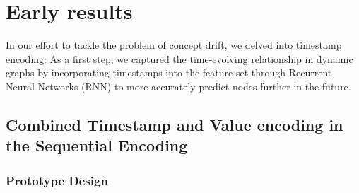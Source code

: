\section{Early results}
\label{sec:results}
In our effort to tackle the problem of concept drift, we delved into timestamp encoding:
As a first step, we captured the time-evolving relationship in dynamic graphs by incorporating timestamps into the feature set through Recurrent Neural Networks (RNN) to more accurately predict nodes further in the future.

\subsection{Combined Timestamp and Value encoding in the Sequential Encoding}

\subsubsection{Prototype Design}

% 
% 


% 

% 
% 




